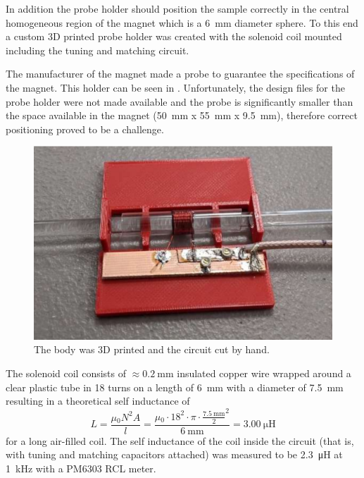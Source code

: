 In addition the probe holder should position the sample correctly in the central homogeneous region of the magnet which is a \qty{6}{\milli\metre} diameter sphere. To this end a custom 3D printed probe holder was created with the solenoid coil mounted including the tuning and matching circuit.

The manufacturer of the magnet made a probe to guarantee the specifications of the magnet. This holder can be seen in . Unfortunately, the design files for the probe holder were not made available and the probe is significantly smaller than the space available in the magnet (\qty{50}{\milli\metre} x \qty{55}{\milli\metre} x \qty{9.5}{\milli\metre}), therefore correct positioning proved to be a challenge.

\begin{figure}[hbt]
    \centering
    \includegraphics[width=\textwidth]{images/andrew-probe.png}
    \caption{ The body was 3D printed and the circuit cut by hand.}
\end{figure}

The solenoid coil consists of \(\approx\qty{0.2}{\milli\metre}\) insulated copper wire wrapped around a clear plastic tube in 18 turns on a length of \qty{6}{\milli\metre} with a diameter of \qty{7.5}{\milli\metre} resulting in a theoretical self inductance of
\[
    L = \frac{\mu{}_0N^2A}{l} = \frac{\mu{}_0 \cdot{} 18^2 \cdot{} \pi{}  \cdot{} \frac{\qty{7.5}{\milli\metre}}{2}^2}{\qty{6}{\milli\metre}} = \qty{3.00}{\micro\henry}
\]
for a long air-filled coil. The self inductance of the coil inside the circuit (that is, with tuning and matching capacitors attached) was measured to be \qty{2.3}{\micro\henry} at \qty{1}{\kilo\hertz} with a PM6303 RCL meter.


